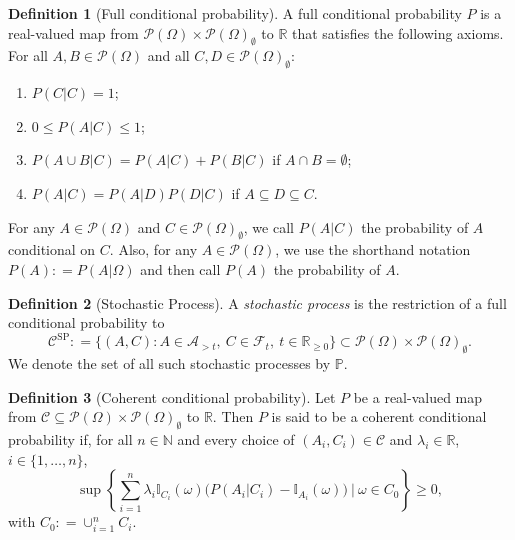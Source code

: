 \documentclass[10pt]{paper}
\theoremstyle{definition}
\newtheorem{definition}{Definition}
\newcommand{\reals}{\mathbb{R}}
\newcommand{\realsnonneg}{\reals_{\geq 0}}
\newcommand{\paths}{\Omega}
\newcommand{\power}{\mathcal{P}(\paths)}
\newcommand{\nonemptypower}{\power_{\emptyset}}
\newcommand{\filter}[1][t]{\mathcal{F}_{#1}}
\newcommand{\processes}{\mathbb{P}}
\newcommand{\ind}[1]{\mathbb{I}_{#1}}
\newcommand{\coloneqq}{:\!=}
\begin{document}
\begin{definition}[Full conditional probability]\label{def:cond_prob}
A full conditional probability $P$ is a real-valued map from $\power\times\nonemptypower$ to $\reals$ that satisfies the following axioms. For all $A,B\in\power$ and all \mbox{$C,D\in\nonemptypower$}:
\vspace{5pt}

\begin{enumerate}[label=F\arabic*:]
\item
$P(C\vert C)=1$;
\item
$0\leq P(A\vert C)\leq 1$;
\item
$P(A\cup B\vert C)=P(A\vert C)+P(B\vert C)$ if $A\cap B=\emptyset$;
\item
$P(A\vert C)=P(A\vert D)P(D\vert C)$ if $A\subseteq D\subseteq C$.
\end{enumerate}
\vspace{5pt}

\noindent
For any $A\in\power$ and $C\in\nonemptypower$, we call $P(A\vert C)$ the probability of $A$ conditional on $C$. Also, for any $A\in\power$, we use the shorthand notation $P(A)\coloneqq P(A\vert\paths)$ and then call $P(A)$ the probability of $A$.
\end{definition}

\begin{definition}[Stochastic Process]\label{def:stoch_process}
A \emph{stochastic process} is the restriction of a full conditional probability to
\begin{equation*}
\mathcal{C}^\mathrm{SP}\coloneqq\big\{
(A,C)
\colon
A\in\mathcal{A}_{> t},~C\in\filter,~t\in\realsnonneg\big\}\subset\power\times\nonemptypower.
\end{equation*}
We denote the set of all such stochastic processes by $\processes$.
\end{definition}



\begin{definition}[Coherent conditional probability]\label{def:coherence}
Let $P$ be a real-valued map from $\mathcal{C}\subseteq\power\times\nonemptypower$ to $\reals$. Then $P$ is said to be a coherent conditional probability if, for all $n\in\mathbb{N}$ and every choice of $(A_i,C_i)\in\mathcal{C}$ and $\lambda_i\in\reals$, $i\in\{1,\dots,n\}$,
\begin{equation*}
\sup\left\{\sum_{i=1}^n\lambda_i\ind{C_i}(\omega)\bigl(P(A_i\vert C_i)-\ind{A_i}(\omega)\bigr)~\Bigg\vert~\omega\in C_0\right\}\geq0,
\end{equation*}
with $C_0\coloneqq\cup_{i=1}^nC_i$.
\end{definition}
\end{document}
